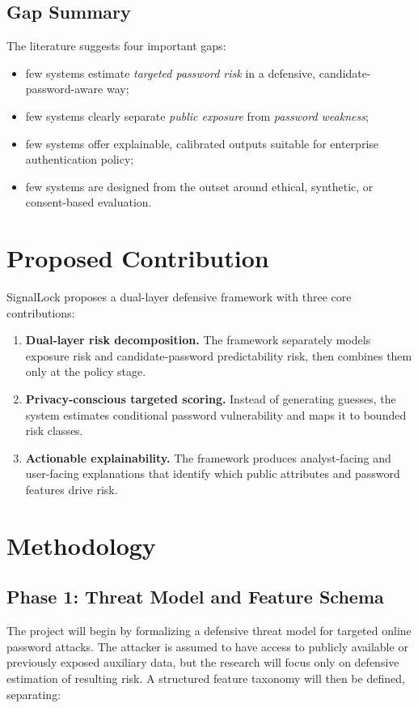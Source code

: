 \documentclass[11pt]{article}
\begin{document}
\subsection{Gap Summary}
The literature suggests four important gaps:

\begin{itemize}[leftmargin=*]
  \item few systems estimate \emph{targeted password risk} in a defensive, candidate-password-aware way;
  \item few systems clearly separate \emph{public exposure} from \emph{password weakness};
  \item few systems offer explainable, calibrated outputs suitable for enterprise authentication policy;
  \item few systems are designed from the outset around ethical, synthetic, or consent-based evaluation.
\end{itemize}

\section{Proposed Contribution}
SignalLock proposes a dual-layer defensive framework with three core contributions:

\begin{enumerate}[leftmargin=*]
  \item \textbf{Dual-layer risk decomposition.} The framework separately models exposure risk and candidate-password predictability risk, then combines them only at the policy stage.
  \item \textbf{Privacy-conscious targeted scoring.} Instead of generating guesses, the system estimates conditional password vulnerability and maps it to bounded risk classes.
  \item \textbf{Actionable explainability.} The framework produces analyst-facing and user-facing explanations that identify which public attributes and password features drive risk.
\end{enumerate}

\section{Methodology}
\subsection{Phase 1: Threat Model and Feature Schema}
The project will begin by formalizing a defensive threat model for targeted online password attacks. The attacker is assumed to have access to publicly available or previously exposed auxiliary data, but the research will focus only on defensive estimation of resulting risk. A structured feature taxonomy will then be defined, separating:
\end{document}
